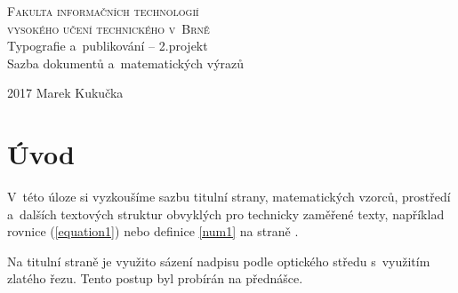 \documentclass[11pt,twocolumn]{article}
\theoremstyle{definition}
\theoremstyle{plain}
\begin{document}
\begin{titlepage}
\begin{center}
\huge\textsc{Fakulta informačních technologií} \\
\smallskip 
\huge\textsc{vysokého učení technického v~Brně} \\
\LARGE{Typografie a~publikování -- 2.projekt} \\
\smallskip
\LARGE{Sazba dokumentů a~matematických výrazů} \\
\end{center}
{\LARGE 2017 \hfill Marek Kukučka}
\end{titlepage}


\section*{Úvod}
V~této úloze si vyzkoušíme sazbu titulní strany, matematických vzorců, prostředí a~dalších textových struktur obvyklých pro technicky zaměřené texty, například rovnice (\ref{equation1}) nebo definice \ref{num1} na straně \pageref{num1}.
\par
Na titulní straně je využito sázení nadpisu podle optického středu s~využitím zlatého řezu. Tento postup byl probírán na přednášce.
\end{document}
